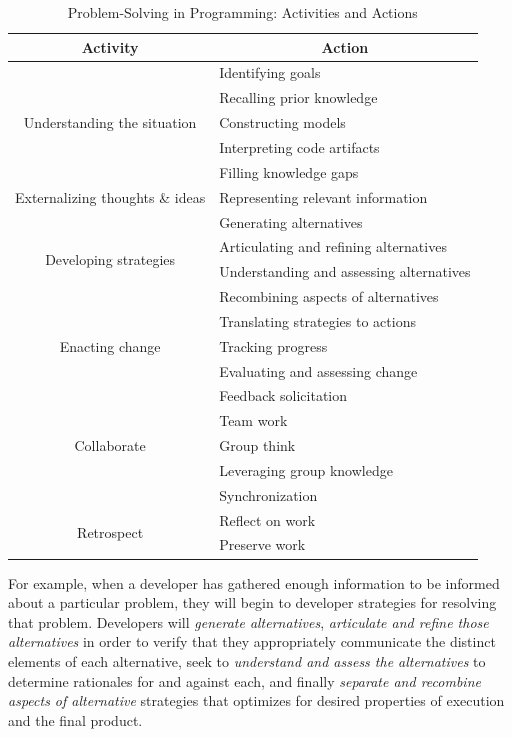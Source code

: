 \documentclass{ppig}
\begin{document}
\begin{table}[!htbp]
\caption{Problem-Solving in Programming: Activities and Actions}
\label{matrix}
\centering
\begin{tabular}{|c|l|}
	\hline
	\multicolumn{1}{|c|}{\textbf{Activity}} 
	& \multicolumn{1}{c|}{\textbf{Action}}\\\hline
	\multirow{5}{*}{Understanding the situation} 
	& Identifying goals \\\cline{2-2}
	& Recalling prior knowledge \\\cline{2-2}
	& Constructing models \\\cline{2-2}
	& Interpreting code artifacts \\\cline{2-2}
	& Filling knowledge gaps \\\hline
	Externalizing thoughts \& ideas 
	& Representing relevant information \\\hline
	\multirow{4}{*}{Developing strategies} 
	& Generating alternatives \\\cline{2-2}
	& Articulating and refining alternatives \\\cline{2-2}
	& Understanding and assessing alternatives \\\cline{2-2}
	& Recombining aspects of alternatives \\\hline
	\multirow{3}{*}{Enacting change} 
	& Translating strategies to actions \\\cline{2-2}
	& Tracking progress \\\cline{2-2}
	& Evaluating and assessing change \\\hline
	\multirow{5}{*}{Collaborate} 
	& Feedback solicitation \\\cline{2-2}
	& Team work \\\cline{2-2}
	& Group think \\\cline{2-2}
	& Leveraging group knowledge \\\cline{2-2}
	& Synchronization \\\hline
	\multirow{2}{*}{Retrospect} 
	& Reflect on work \\\cline{2-2}
	& Preserve work \\\hline
\end{tabular}
\end{table}

For example, when a developer has gathered enough information to be informed about a particular problem, they will begin to developer strategies for resolving that problem.
Developers will \textit{generate alternatives}, \textit{articulate and refine those alternatives} in order to verify that they appropriately communicate the distinct elements of each alternative, seek to \textit{understand and assess the alternatives} to determine rationales for and against each, and finally \textit{separate and recombine aspects of alternative} strategies that optimizes for desired properties of execution and the final product.
\end{document}
